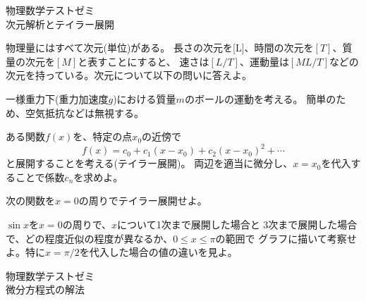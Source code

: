 \documentclass{jarticle}
\begin{document}
\begin{center}
{\huge 物理数学テストゼミ}\\[3mm]
{\Large 次元解析とテイラー展開}
\end{center}

\question 物理量にはすべて次元(単位)がある。
長さの次元を[L]、時間の次元を$[T]$、質量の次元を$[M]$と表すことにすると、
速さは$[L/T]$、運動量は$[M L/T]$などの
次元を持っている。次元について以下の問いに答えよ。



\question
一様重力下(重力加速度$g$)における質量$m$のボールの運動を考える。
簡単のため、空気抵抗などは無視する。


\question
ある関数$f(x)$を、特定の点$x_0$の近傍で
$$
f(x) = c_0 + c_1(x-x_0) + c_2 (x-x_0)^2 + \cdots 
$$
と展開することを考える(テイラー展開)。
両辺を適当に微分し、$x=x_0$を代入することで係数$c_n$を求めよ。

\question
次の関数を$x=0$の周りでテイラー展開せよ。


\question
$\sin x$を$x=0$の周りで、$x$について1次まで展開した場合と
3次まで展開した場合で、どの程度近似の程度が異なるか、$0 \le x \le \pi$の範囲で
グラフに描いて考察せよ。特に$x = \pi/2$を代入した場合の値の違いを見よ。


\newpage

\begin{center}
{\huge 物理数学テストゼミ}\\[3mm]
{\Large 微分方程式の解法}
\end{center}
\end{document}
